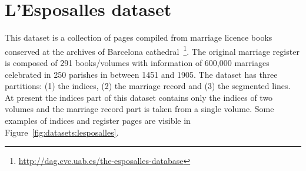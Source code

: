 \section{L'Esposalles dataset}
\label{sec:datasets:lesposalles}
This dataset is a collection of pages compiled from marriage licence books conserved at the archives of Barcelona cathedral~\cite{Romero2013}\footnote{\url{http://dag.cvc.uab.es/the-esposalles-database}}. The original marriage register is composed of 291 books/volumes with information of 600,000 marriages celebrated in 250 parishes in between 1451 and 1905. The dataset has three partitions: (1) the indices, (2) the marriage record and (3) the segmented lines. At present the indices part of this dataset contains only the indices of two volumes and the marriage record part is taken from a single volume. Some examples of indices and register pages are visible in Figure~\ref{fig:datasets:lesposalles}.